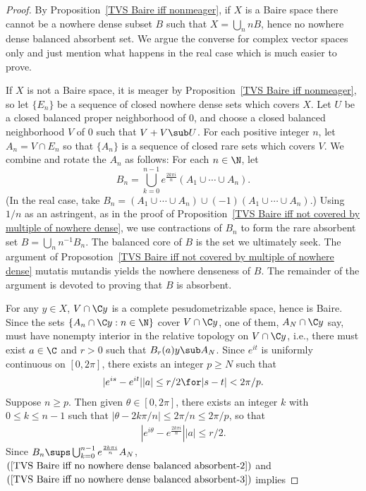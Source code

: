 \begin{proof}
By Proposition~\ref{TVS Baire iff nonmeager}, if $X$ is a Baire space there cannot be a nowhere dense subset $B$ such that $X=\bigcup_nnB$, hence no nowhere dense balanced absorbent set. We argue the converse for complex vector spaces only and just mention what happens in the real case which is much easier to prove.\par
If $X$ is not a Baire space, it is meager by Proposition~\ref{TVS Baire iff nonmeager}, so let $\{E_n\}$ be a sequence of closed nowhere dense sets which covers $X$. Let $U$ be a closed balanced proper neighborhood of $0$, and choose a closed balanced neighborhood $V$ of $0$ such that $V+V\sub U$. For each positive integer $n$, let $A_n=V\cap E_n$ so that $\{A_n\}$ is a sequence of closed rare sets which covers $V$. We combine and rotate the $A_n$ as follows: For each $n\in\N$, let
\[B_n=\bigcup_{k=0}^{n-1}e^{\frac{2k\pi i}{n}}(A_1\cup\cdots\cup A_n).\]
(In the real case, take $B_n=(A_1\cup\cdots\cup A_n)\cup(-1)(A_1\cup\cdots\cup A_n)$.) Using $1/n$ as an astringent, as in the proof of Proposition~\ref{TVS Baire iff not covered by multiple of nowhere dense}, we use contractions of $B_n$ to form the rare absorbent set $B=\bigcup_nn^{-1}B_n$. The balanced core of $B$ is the set we ultimately seek. The argument of Proposotion~\ref{TVS Baire iff not covered by multiple of nowhere dense} mutatis mutandis yields the nowhere denseness of $B$. The remainder of the argument is devoted to proving that $B$ is absorbent.\par
For any $y\in X$, $V\cap\C y$ is a complete pesudometrizable space, hence is Baire. Since the sets $\{A_n\cap\C y:n\in\N\}$ cover $V\cap\C y$, one of them, $A_N\cap\C y$ say, must have nonempty interior in the relative topology on $V\cap\C y$, i.e., there must exist $a\in\C$ and $r>0$ such that $B_r(a)y\sub A_N$. Since $e^{it}$ is uniformly continuous on $[0,2\pi]$, there exists an integer $p\geq N$ such that
\begin{align}\label{TVS Baire iff no nowhere dense balanced absorbent-1}
|e^{is}-e^{it}||a|\leq r/2\for|s-t|<2\pi/p.
\end{align}
Suppose $n\geq p$. Then given $\theta\in[0,2\pi]$, there exists an integer $k$ with $0\leq k\leq n-1$ such that $|\theta-2k\pi/n|\leq 2\pi/n\leq 2\pi/p$, so that
\begin{align}\label{TVS Baire iff no nowhere dense balanced absorbent-2}
|e^{i\theta}-e^{\frac{2k\pi i}{n}}||a|\leq r/2.
\end{align}
Since $B_n\sups\bigcup_{k=0}^{n-1}e^{\frac{2k\pi i}{n}}A_N$, $(\ref{TVS Baire iff no nowhere dense balanced absorbent-2})$ and $(\ref{TVS Baire iff no nowhere dense balanced absorbent-3})$ implies

\end{proof}
